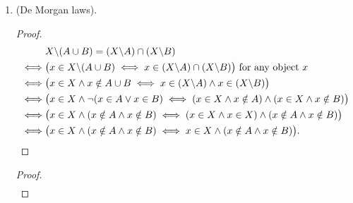 \begin{enumerate}
\begin{proof}
\begin{align*}
        \end{align*}
    \end{proof}
    \begin{proof}
        We shall deduce what is required for $A \cap (X\backslash A) = \emptyset$ to be true.
        \begin{align*}
            & A \cap (X\backslash A) = \emptyset
            \\\iff& \big( x \in A \cap (X\backslash A) \iff x \in \emptyset \big) \text{ for any object $x$}
            \\\iff& \big( x \in A \land x \in (X\backslash A) \iff x \in \emptyset \big) 
            \\\iff& \big( x \in A \land (x \in X \land x \notin A) \iff x \in \emptyset \big)
            \\\iff& \big( x \in X \land (x \in A \land x \notin A) \iff x \in \emptyset \big)
            \\\iff& ( x \in X \land \bot \iff \bot )
            \\\iff& (\bot \iff \bot),
        \end{align*}
        which is a true statement.
    \end{proof}
    \item (De Morgan laws).
    \begin{proof}
        \begin{align*}
            & X\backslash (A \cup B) = (X\backslash A) \cap (X\backslash B)
            \\\iff& \big(x \in X\backslash (A \cup B) \iff x \in (X\backslash A) \cap (X\backslash B) \big) \text{ for any object $x$}
            \\\iff& \big(x \in X \land x \notin A \cup B \iff x \in (X\backslash A) \land x \in (X\backslash B) \big)
            \\\iff& \big(x \in X \land \lnot (x \in A \lor x \in B) \iff (x \in X \land x \notin A) \land (x \in X \land x \notin B) \big)
            \\\iff& \big(x \in X \land (x \notin A \land x \notin B) \iff (x \in X \land x \in X) \land (x \notin A \land x \notin B) \big)
            \\\iff& \big(x \in X \land (x \notin A \land x \notin B) \iff x \in X \land (x \notin A \land x \notin B) \big). \qedhere
        \end{align*}
    \end{proof}
    \begin{proof}
        \begin{align*}

\end{align*}
\end{proof}
\end{enumerate}
